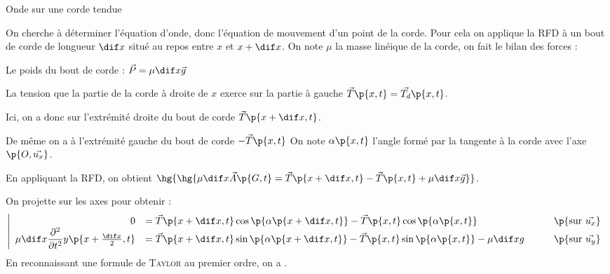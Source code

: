 \begin{example}{Onde sur une corde tendue}{}
\begin{minipage}{0.5\linewidth}
\begin{center}
            \end{center}
        \end{minipage}
        On cherche à déterminer l'équation d'onde, donc l'équation de mouvement d'un point de la corde. Pour cela on applique la RFD à un bout de corde de longueur $\dif x$ situé au repos entre $x$ et $x+\dif x$. On note $\mu$ la masse linéique de la corde, on fait le bilan des forces :
        \begin{enumerate}
            \itt Le poids du bout de corde : $\vec P = \mu\dif x \vec{g}$
            
            \itt La tension que la partie de la corde à droite de $x$ exerce sur la partie à gauche $\vec T\p{x,t} = \vec{T_d}\p{x,t}$.
            
            Ici, on a donc sur l'extrémité droite du bout de corde $\vec{T}\p{x+\dif x,t}$.
            
            De même on a à l'extrémité gauche du bout de corde  $-\vec{T}\p{x,t}$
            On note $\alpha\p{x,t}$ l'angle formé par la tangente à la corde avec l'axe $\p{O, \vec{u_x}}$.
        \end{enumerate}
        
        En appliquant la RFD, on obtient \qquad $\hg{\hg{\mu\dif x \vec{A}\p{G,t} = \vec{T}\p{x+\dif x,t}- \vec{T}\p{x,t} +\mu\dif x\vec{g}}}$.

        On projette sur les axes pour obtenir :
        \[ \left\vert\begin{array}{rlc}
            0 &= \vec{T}\p{x+\dif x,t}\cos\p{\alpha\p{x+\dif x, t}} - \vec{T}\p{x,t}\cos\p{\alpha\p{x,t}} & \qquad\p{\text{sur} \ \vec{u_x}}\\
            \mu\dif x \dfrac{\partial^2}{\partial t^2}y\p{x+\frac{\dif x}{2},t} &= \vec{T}\p{x+\dif x,t}\sin\p{\alpha\p{x+\dif x, t}} - \vec{T}\p{x,t}\sin\p{\alpha\p{x,t}} -\mu\dif x g &\qquad\p{\text{sur} \ \vec{u_y}}
        \end{array}\right.\]
        En reconnaissant une formule de \textsc{Taylor} au premier ordre, on a .
        

\end{example}
